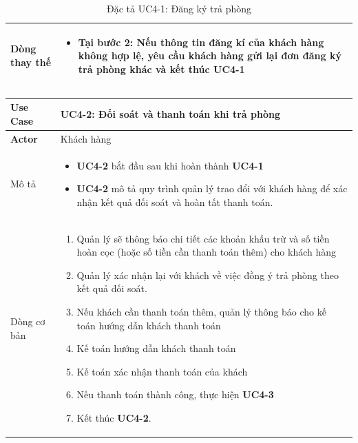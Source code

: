 \begin{table}[H]
\begin{tabularx}{\textwidth}{|>{\centering\arraybackslash\bfseries}m{3.5cm}|X|}
    Dòng thay thế & 
    \vspace{0.2cm}
    \begin{itemize}[leftmargin=*, nosep, label=-]
        \item \textbf{Tại bước 2:} Nếu thông tin đăng kí của khách hàng không hợp lệ, yêu cầu khách hàng gửi  lại đơn đăng ký trả phòng khác và kết thúc \textbf{UC4-1}
    \end{itemize} \\ 
    \hline
\end{tabularx}
\caption{Đặc tả UC4-1: Đăng ký trả phòng}
\label{tab:uc4-1}
\end{table}



\begin{table}[H]
    \centering
    \vspace{0.2cm}
\begin{tabularx}{\textwidth}{|>{\centering\arraybackslash\bfseries}m{3.5cm}|X|}
    \hline
    Use Case & {\centering\textbf{UC4-2: Đối soát và thanh toán khi trả phòng
}\par} \\ 
    \hline
     
    Actor & Khách hàng \\
    \hline

    Mô tả & 
    \vspace{0.2cm}
    \begin{itemize}[leftmargin=*, nosep, label=-]
        \item \textbf{UC4-2} bắt đầu sau khi hoàn thành \textbf{UC4-1}
        \item \textbf{UC4-2} mô tả quy trình quản lý trao đổi với khách hàng để xác nhận kết quả đối soát và hoàn tất thanh toán.
    \end{itemize} \\ 
    \hline
     
    Dòng cơ bản & 
    \vspace{0.2cm}
    \begin{enumerate}[leftmargin=*, nosep]
        \item Quản lý sẽ thông báo chi tiết các khoản khấu trừ và số tiền hoàn cọc (hoặc số tiền cần thanh toán thêm) cho khách hàng
        \item Quản lý xác nhận lại với khách về việc đồng ý trả phòng theo kết quả đối soát.
        \item Nếu khách cần thanh toán thêm, quản lý thông báo cho kế toán hướng dẫn khách thanh toán
        \item Kế toán hướng dẫn khách thanh toán
        \item Kế toán xác nhận thanh toán của khách
        \item Nếu thanh toán thành công, thực hiện \textbf{UC4-3}
        \item Kết thúc \textbf{UC4-2}.
    \end{enumerate} \\ 
    \hline
     

\end{tabularx}
\end{table}
